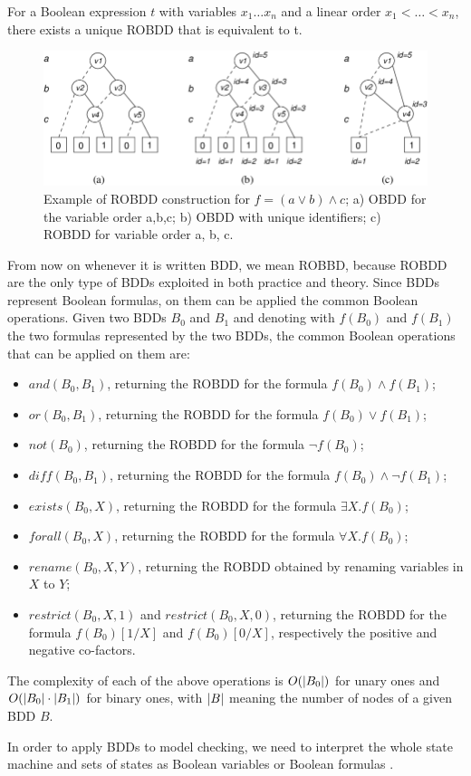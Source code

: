 \begin{proposition}
For a Boolean expression $t$ with variables $x_1 \dots x_n$ and a linear order $x_1 < \dots < x_n$, there exists a unique ROBDD that is equivalent to t.
\end{proposition}

\begin{figure}[!htp]
    \centering
    \includegraphics[width=0.8\linewidth]{figures/robdd-example.png}
    \caption{\cite{dhiraj-2023} Example of ROBDD construction for $f=(a \lor b) \land c$; a) OBDD for the variable order a,b,c; b) OBDD with unique identifiers; c) ROBDD for variable order a, b, c.}
    \label{fig:robdd-construction-example}
\end{figure}

From now on whenever it is written BDD, we mean ROBBD, because ROBDD are the only type of BDDs exploited in both practice and theory.
Since BDDs represent Boolean formulas, on them can be applied the common Boolean operations.
Given two BDDs $B_0$ and $B_1$ and denoting with $f(B_0)$ and $f(B_1)$ the two formulas represented by the two BDDs, the common Boolean operations that can be applied on them are:
\begin{itemize}
    \item $and(B_0,B_1)$, returning the ROBDD for the formula $f(B_0) \land f(B_1)$;
    \item $or(B_0,B_1)$, returning the ROBDD for the formula $f(B_0) \lor f(B_1)$;
    \item $not(B_0)$, returning the ROBDD for the formula $\neg f(B_0)$;
    \item $diff(B_0,B_1)$, returning the ROBDD for the formula $f(B_0) \land \neg f(B_1)$;
    \item $exists(B_0,X)$, returning the ROBDD for the formula $\exists X.f(B_0)$;
    \item $forall(B_0,X)$, returning the ROBDD for the formula $\forall X.f(B_0)$;
    \item $rename(B_0,X,Y)$, returning the ROBDD obtained by renaming variables in $X$ to $Y$;
    \item $restrict(B_0,X,1)$ and $restrict(B_0,X,0)$, returning the ROBDD for the formula $f(B_0)[1/X]$ and $f(B_0)[0/X]$, respectively the positive and negative co-factors.
\end{itemize} 

The complexity of each of the above operations is $O(\left\lvert B_0 \right\rvert)$ for unary ones and $O(\left\lvert B_0 \right\rvert \cdot \left\lvert B_1 \right\rvert)$ for binary ones, with $\left\lvert B \right\rvert$ meaning the number of nodes of a given BDD $B$.

In order to apply BDDs to model checking, we need to interpret the whole state machine and sets of states as Boolean variables or Boolean formulas .
